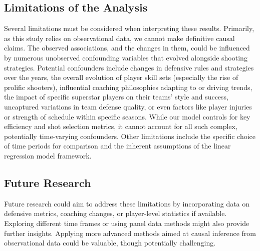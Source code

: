 \documentclass[11pt, a4paper]{article} %
\begin{document}
\subsection{Limitations of the Analysis} %
Several limitations must be considered when interpreting these results. Primarily, as this study relies on observational data, 
we cannot make definitive causal claims. The observed associations, and the changes in them, could be influenced by numerous 
unobserved confounding variables that evolved alongside shooting strategies. Potential confounders include changes in defensive 
rules and strategies over the years, the overall evolution of player skill sets (especially the rise of prolific shooters), 
influential coaching philosophies adapting to or driving trends, the impact of specific superstar players on their teams' style 
and success, uncaptured variations in team defense quality, or even factors like player injuries or strength of schedule within 
specific seasons. While our model controls for key efficiency and shot selection metrics, it cannot account for all such complex, 
potentially time-varying confounders. Other limitations include the specific choice of time periods for comparison and the inherent 
assumptions of the linear regression model framework.

\subsection{Future Research} %
Future research could aim to address these limitations by incorporating data on defensive metrics, coaching changes, or player-level statistics if available. Exploring different time frames or using panel data methods might also provide further insights. Applying more advanced methods aimed at causal inference from observational data could be valuable, though potentially challenging.


\end{document}

